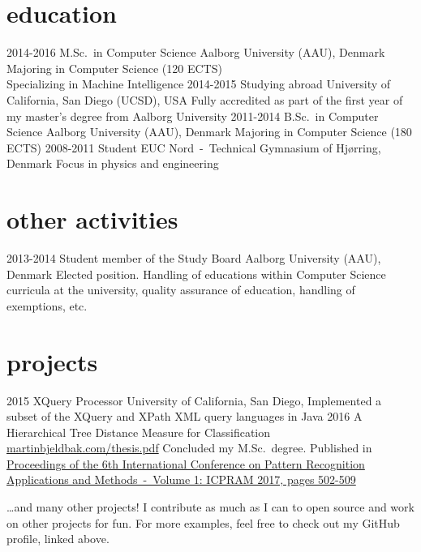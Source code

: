\documentclass{afriggeri-cv/friggeri-cv}
\newcommand{\aau}{%
  Aalborg University (AAU), Denmark
}
\begin{document}
\section{education}

\begin{entrylist}
  \entry
    {2014-2016}
    {M.Sc.\ {\normalfont in Computer Science}}
    {\aau}
    {Majoring in Computer Science (120 ECTS)\\
    Specializing in Machine Intelligence}
  \entry
    {2014-2015}
    {Studying abroad}
    {University of California, San Diego (UCSD), USA}
    {Fully accredited as part of the first year of my master's degree from Aalborg University}
  \entry
    {2011-2014}
    {B.Sc.\ {\normalfont in Computer Science}}
    {\aau}
    {Majoring in Computer Science (180 ECTS)}
  \entry
    {2008-2011}
    {Student}
    {EUC Nord~-~Technical Gymnasium of Hjørring, Denmark}
    {Focus in physics and engineering}
\end{entrylist}

\section{other activities}
\begin{entrylist}
  \entry
    {2013-2014}
    {Student member of the Study Board}
    {\aau}
    {Elected position. Handling of educations within Computer Science curricula at the university, quality assurance of education, handling of exemptions, etc.}
\end{entrylist}

\section{projects}
\begin{entrylist}
  \entry
    {2015}
    {XQuery Processor}
    {University of California, San Diego, }
    {Implemented a subset of the XQuery and XPath XML query languages in Java}
  \entry
    {2016}
    {A Hierarchical Tree Distance Measure for Classification}
    {\href{https://martinbjeldbak.com/thesis.pdf}{martinbjeldbak.com/thesis.pdf}}
    {Concluded my M.Sc.\ degree. Published in \href{https://www.scitepress.org/Papers/2017/61985/}{Proceedings of the 6th International Conference on Pattern Recognition Applications and Methods~-~Volume 1: ICPRAM 2017, pages 502-509}}
\end{entrylist}

\dots and many other projects! I contribute as much as I can to open source and work on other projects for fun. For more examples, feel free to check out my GitHub profile, linked above.
\end{document}
